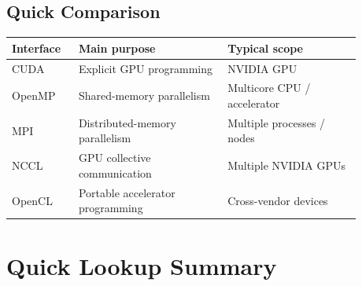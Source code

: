 \documentclass[11pt,a4paper]{article}
\begin{document}
\subsection{Quick Comparison}

\begin{center}
\begin{tabular}{p{0.16\linewidth}p{0.38\linewidth}p{0.34\linewidth}}
\toprule
Interface & Main purpose & Typical scope \\
\midrule
CUDA & Explicit GPU programming & NVIDIA GPU \\
OpenMP & Shared-memory parallelism & Multicore CPU / accelerator \\
MPI & Distributed-memory parallelism & Multiple processes / nodes \\
NCCL & GPU collective communication & Multiple NVIDIA GPUs \\
OpenCL & Portable accelerator programming & Cross-vendor devices \\
\bottomrule
\end{tabular}
\end{center}

\section{Quick Lookup Summary}
\end{document}
